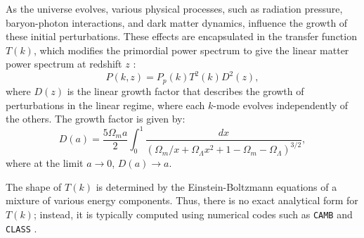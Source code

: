 As the universe evolves, various physical processes, such as radiation pressure, baryon-photon interactions, and dark matter dynamics, influence the growth of these initial perturbations. These effects are encapsulated in the transfer function $T(k)$, which modifies the primordial power spectrum to give the linear matter power spectrum at redshift $z$ \citep{2003moco.book.....D}:
\begin{equation}
    P(k, z) = P_p(k) T^2(k) D^2(z),
\end{equation}
where $D(z)$ is the linear growth factor that describes the growth of perturbations in the linear regime, where each $k$-mode evolves independently of the others. The growth factor is given by:
\begin{equation}
    D(a) = \frac{5 \Omega_m a}{2} \int_0^1 \frac{dx}{(\Omega_m / x + \Omega_\Lambda x^2 + 1 - \Omega_m - \Omega_\Lambda)^{3/2}},
\end{equation}
where at the limit $a \to 0$, $D(a) \to a$. 

The shape of $T(k)$ is determined by the Einstein-Boltzmann equations of a mixture of various energy components. Thus, there is no exact analytical form for $T(k)$; instead, it is typically computed using numerical codes such as \texttt{CAMB} \citep{2000ApJ...538..473L} and \texttt{CLASS} \citep{2011JCAP...07..034B}.

